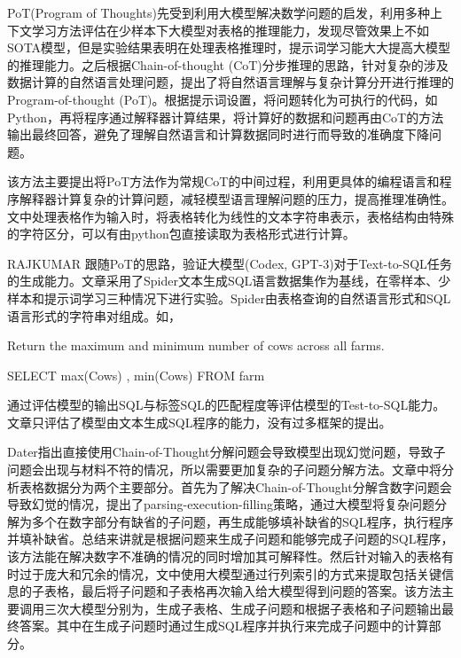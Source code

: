 PoT(Program of Thoughts)\cite{chenLargeLanguageModels2023,chenProgramThoughtsPrompting2023}先受到利用大模型解决数学问题的启发，利用多种上下文学习方法评估在少样本下大模型对表格的推理能力，发现尽管效果上不如SOTA模型，但是实验结果表明在处理表格推理时，提示词学习能大大提高大模型的推理能力。之后根据Chain-of-thought (CoT)\cite{weiChainofthoughtPromptingElicits2022}分步推理的思路，针对复杂的涉及数据计算的自然语言处理问题，提出了将自然语言理解与复杂计算分开进行推理的Program-of-thought (PoT)。根据提示词设置，将问题转化为可执行的代码，如Python，再将程序通过解释器计算结果，将计算好的数据和问题再由CoT的方法输出最终回答，避免了理解自然语言和计算数据同时进行而导致的准确度下降问题。

该方法主要提出将PoT方法作为常规CoT的中间过程，利用更具体的编程语言和程序解释器计算复杂的计算问题，减轻模型语言理解问题的压力，提高推理准确性。文中处理表格作为输入时，将表格转化为线性的文本字符串表示，表格结构由特殊的字符区分，可以有由python包直接读取为表格形式进行计算。

RAJKUMAR \cite{rajkumarEvaluatingTexttoSQLCapabilities2022}跟随PoT\cite{chenProgramThoughtsPrompting2023}的思路，验证大模型(Codex, GPT-3)对于Text-to-SQL任务的生成能力。文章采用了Spider文本生成SQL语言数据集作为基线，在零样本、少样本和提示词学习三种情况下进行实验。Spider由表格查询的自然语言形式和SQL语言形式的字符串对组成。如，

Return the maximum and minimum number of cows across all farms.

	SELECT max(Cows) , min(Cows) FROM farm
    
通过评估模型的输出SQL与标签SQL的匹配程度等评估模型的Test-to-SQL能力。文章只评估了模型由文本生成SQL程序的能力，没有过多框架的提出。

Dater\cite{yeLargeLanguageModels2023}指出直接使用Chain-of-Thought分解问题会导致模型出现幻觉问题，导致子问题会出现与材料不符的情况，所以需要更加复杂的子问题分解方法。文章中将分析表格数据分为两个主要部分。首先为了解决Chain-of-Thought分解含数字问题会导致幻觉的情况，提出了parsing-execution-filling策略，通过大模型将复杂问题分解为多个在数字部分有缺省的子问题，再生成能够填补缺省的SQL程序，执行程序并填补缺省。总结来讲就是根据问题来生成子问题和能够完成子问题的SQL程序，该方法能在解决数字不准确的情况的同时增加其可解释性。然后针对输入的表格有时过于庞大和冗余的情况，文中使用大模型通过行列索引的方式来提取包括关键信息的子表格，最后将子问题和子表格再次输入给大模型得到问题的答案。该方法主要调用三次大模型分别为，生成子表格、生成子问题和根据子表格和子问题输出最终答案。其中在生成子问题时通过生成SQL程序并执行来完成子问题中的计算部分。

